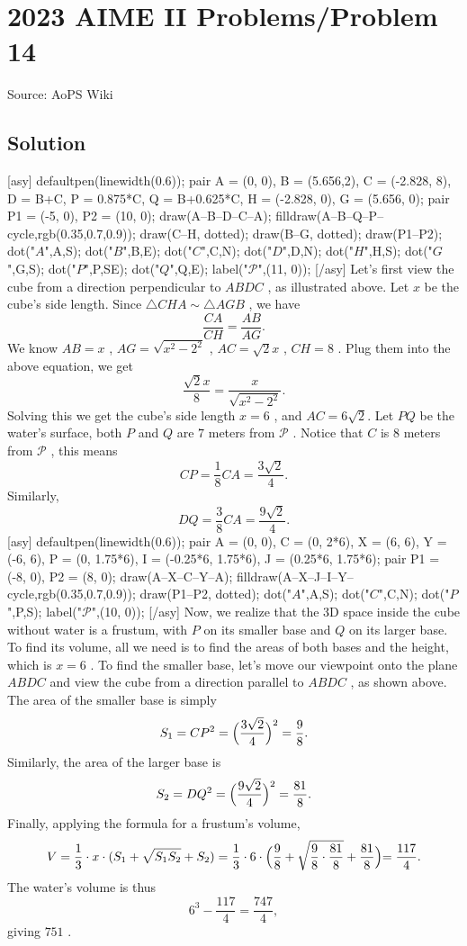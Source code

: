 \documentclass[12pt]{article}
\begin{document}
\section*{{2023 AIME II Problems/Problem 14}}
Source: AoPS Wiki

\subsection*{Solution}
[asy] defaultpen(linewidth(0.6)); pair A = (0, 0), B = (5.656,2), C = (-2.828, 8), D = B+C, P = 0.875*C, Q = B+0.625*C, H = (-2.828, 0), G = (5.656, 0); pair P1 = (-5, 0), P2 = (10, 0); draw(A--B--D--C--A); filldraw(A--B--Q--P--cycle,rgb(0.35,0.7,0.9)); draw(C--H, dotted); draw(B--G, dotted); draw(P1--P2); dot("$A$",A,S); dot("$B$",B,E); dot("$C$",C,N); dot("$D$",D,N); dot("$H$",H,S); dot("$G$",G,S); dot("$P$",P,SE); dot("$Q$",Q,E); label("$\mathcal P$",(11, 0)); [/asy] Let's first view the cube from a direction perpendicular to $ABDC$ , as illustrated above. Let $x$ be the cube's side length. Since $\triangle CHA \sim \triangle AGB$ , we have \[\frac{CA}{CH} = \frac{AB}{AG}.\] We know $AB = x$ , $AG = \sqrt{x^2-2^2}$ , $AC = \sqrt{2}x$ , $CH = 8$ . Plug them into the above equation, we get \[\frac{\sqrt{2}x}{8} = \frac{x}{\sqrt{x^2-2^2}}.\] Solving this we get the cube's side length $x = 6$ , and $AC = 6\sqrt{2}.$ Let $PQ$ be the water's surface, both $P$ and $Q$ are $7$ meters from $\mathcal P$ . Notice that $C$ is $8$ meters from $\mathcal P$ , this means \[CP = \frac{1}{8}CA = \frac{3\sqrt{2}}{4}.\] Similarly, \[DQ = \frac{3}{8}CA = \frac{9\sqrt{2}}{4}.\] [asy] defaultpen(linewidth(0.6)); pair A = (0, 0), C = (0, 2*6), X = (6, 6), Y = (-6, 6), P = (0, 1.75*6), I = (-0.25*6, 1.75*6), J = (0.25*6, 1.75*6); pair P1 = (-8, 0), P2 = (8, 0); draw(A--X--C--Y--A); filldraw(A--X--J--I--Y--cycle,rgb(0.35,0.7,0.9)); draw(P1--P2, dotted); dot("$A$",A,S); dot("$C$",C,N); dot("$P$",P,S); label("$\mathcal P$",(10, 0)); [/asy] Now, we realize that the 3D space inside the cube without water is a frustum, with $P$ on its smaller base and $Q$ on its larger base. To find its volume, all we need is to find the areas of both bases and the height, which is $x = 6$ . To find the smaller base, let's move our viewpoint onto the plane $ABDC$ and view the cube from a direction parallel to $ABDC$ , as shown above. The area of the smaller base is simply \[S_1 = CP^2 = \Bigl(\frac{3\sqrt{2}}{4}\Bigr)^2 = \frac{9}{8}.\] Similarly, the area of the larger base is \[S_2 = DQ^2 = \Bigl(\frac{9\sqrt{2}}{4}\Bigr)^2 = \frac{81}{8}.\] Finally, applying the formula for a frustum's volume, \[V = \frac{1}{3} \cdot x \cdot (S_1 + \sqrt{S_1S_2} + S_2) = \frac{1}{3} \cdot 6 \cdot \Bigl(\frac{9}{8} + \sqrt{\frac{9}{8}\cdot\frac{81}{8}} + \frac{81}{8}\Bigl) = \frac{117}{4}.\] The water's volume is thus \[6^3 - \frac{117}{4} = \frac{747}{4},\] giving $\boxed{751}$ .
\end{document}

